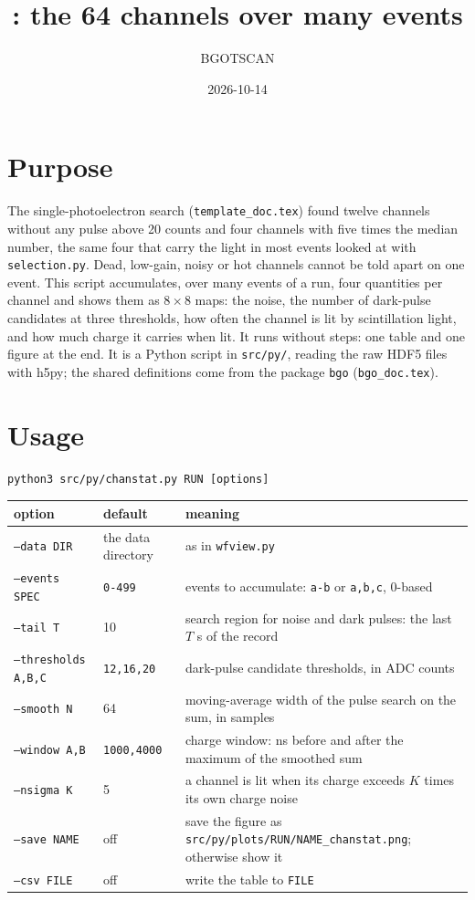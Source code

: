 \documentclass[11pt]{article}
\title{\code{chanstat.py}: the 64 channels over many events}
\author{BGOTSCAN}
\date{2026-10-14}
\newcommand{\code}[1]{\texttt{#1}}
\newcommand{\us}{\textmu s}
\begin{document}
\maketitle

\section{Purpose}

The single-photoelectron search (\code{template\_doc.tex}) found twelve
channels without any pulse above 20 counts and four channels with five
times the median number, the same four that carry the light in most
events looked at with \code{selection.py}. Dead, low-gain, noisy or hot
channels cannot be told apart on one event. This script accumulates, over
many events of a run, four quantities per channel and shows them as
$8\times8$ maps: the noise, the number of dark-pulse candidates at three
thresholds, how often the channel is lit by scintillation light, and how
much charge it carries when lit. It runs without steps: one table and one
figure at the end. It is a Python script in \code{src/py/}, reading the
raw HDF5 files with h5py; the shared definitions come from the package
\code{bgo} (\code{bgo\_doc.tex}).

\section{Usage}

\begin{lstlisting}
python3 src/py/chanstat.py RUN [options]
\end{lstlisting}

\begin{center}
\begin{tabular}{l l p{76mm}}
\toprule
option & default & meaning \\
\midrule
\code{--data DIR} & the data directory & as in \code{wfview.py} \\
\code{--events SPEC} & \code{0-499} & events to accumulate: \code{a-b} or \code{a,b,c}, 0-based \\
\code{--tail T} & 10 & search region for noise and dark pulses: the last $T$ \us{} of the record \\
\code{--thresholds A,B,C} & \code{12,16,20} & dark-pulse candidate thresholds, in ADC counts \\
\code{--smooth N} & 64 & moving-average width of the pulse search on the sum, in samples \\
\code{--window A,B} & \code{1000,4000} & charge window: ns before and after the maximum of the smoothed sum \\
\code{--nsigma K} & 5 & a channel is lit when its charge exceeds $K$ times its own charge noise \\
\code{--save NAME} & off & save the figure as \code{src/py/plots/RUN/NAME\_chanstat.png}; otherwise show it \\
\code{--csv FILE} & off & write the table to \code{FILE} \\
\bottomrule
\end{tabular}
\end{center}
\end{document}
